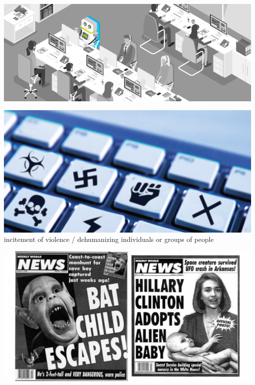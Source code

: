 \documentclass[landscape]{jhuslides3C}
\begin{document}

\vfill
\begin{center}
\includegraphics[width=25cm]{CallCenterAutomation.png}
\end{center}
\vfill



\vfill
\begin{center}
\includegraphics[width=20cm]{hate-speech.png}\\[1cm]
incitement of violence / dehumanizing individuals or groups of people
\end{center}
\vfill


\vfill
\begin{center}
\includegraphics[width=25cm]{fake-news3.png}
\end{center}
\vfill
\end{document}

